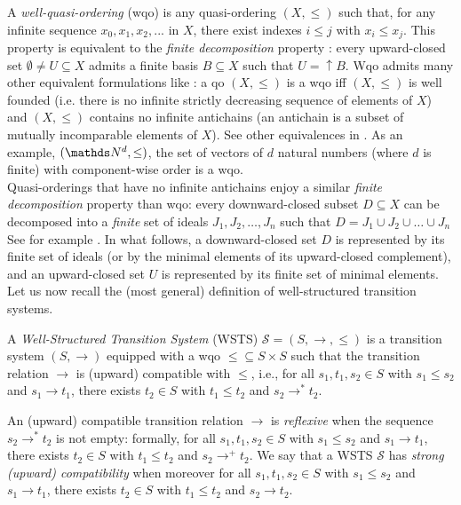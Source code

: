 \documentclass[runningheads]{llncs}
\begin{document}
 A {\em well-quasi-ordering} (wqo) is any quasi-ordering $(X,\leq)$ such that, for any infinite sequence $x_0, x_1, x_2, ...$ in $X$, there exist indexes $i \leq j$ with $x_i \leq  x_j$. This property is equivalent to the \emph{finite decomposition} property : every upward-closed set $\emptyset \neq U \subseteq X$ admits a finite basis $B \subseteq X$ such that $U=\mathop{\uparrow} B$.
%
%
%
Wqo admits many other equivalent formulations like : a qo $(X,\leq)$ is a wqo iff $(X,\leq)$ is well founded (i.e. there is no infinite strictly decreasing sequence
of elements of $X$) and $(X,\leq)$ contains no infinite antichains (an antichain is a subset of mutually incomparable elements of $X$). See other equivalences in \cite{DBLP:phd/hal/Halfon18,schmitz:cel-00727025}. 
%
%
As an example, $(\N^d, \leq)$, the set of vectors of $d$ natural numbers (where $d$ is finite) with component-wise order is a wqo.\\
Quasi-orderings that have no 
infinite antichains
 enjoy a similar \emph{finite decomposition} property than wqo: every downward-closed subset $D \subseteq X$ can be decomposed into a \emph{finite} set of ideals $J_1, J_2, \ldots, J_n$ such that $D = J_1 \cup J_2 \cup \ldots \cup J_n$ See for example \cite{BFM-ic17}.
%
%
In what follows, a downward-closed set $D$ is represented by its finite set of ideals (or by the minimal elements of its upward-closed complement), and an upward-closed set $U$ is represented by its finite set of minimal elements. \\

\noindent
Let us now recall the (most general) definition of well-structured transition systems.
\begin{definition}
A {\em Well-Structured Transition System} (WSTS)  $\mathscr{S}=(S, \rightarrow, \leq)$
is a transition system $(S, \rightarrow)$
equipped with a wqo ${\leq} \subseteq S \times S$ such that   
the transition relation $ \rightarrow$ is (upward) compatible with $\leq$, i.e., for all 
$s_1, t_1 , s_2 \in S$
	with $s_1 \leq s_2$  and $s_1 \rightarrow t_1$, there exists 
	$t_2 \in S$ with 
	$t_1 \leq t_2$ and $s_2 \rightarrow^{*} t_2$.
\end{definition}

An (upward) compatible transition relation $ \rightarrow$ is \emph{reflexive} when the sequence $s_2 \rightarrow^{*} t_2$ is not empty: formally,
for all 
$s_1, t_1 , s_2 \in S$
	with $s_1 \leq s_2$  and $s_1 \rightarrow t_1$, there exists 
	$t_2 \in S$ with 
	$t_1 \leq t_2$ and $s_2 \rightarrow^{+} t_2$.
%
We say that a WSTS $\mathscr{S}$ has \emph{strong (upward) compatibility} when moreover for all 
$s_1, t_1 , s_2 \in S$
	with $s_1 \leq s_2$  and $s_1 \rightarrow t_1$, there exists 
	$t_2 \in S$ with 
	$t_1 \leq t_2$ and $s_2 \rightarrow t_2$.
\end{document}
